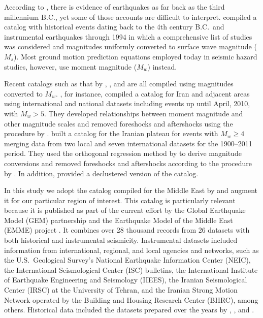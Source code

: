 According to \citet{Ambraseys_1982_Book}, there is evidence of earthquakes as far back as the third millennium B.C., yet some of those accounts are difficult to interpret. \citet{Mirzaei1997} compiled a catalog with historical events dating back to the 4th century B.C.~and instrumental earthquakes through 1994 in which a comprehensive list of studies was considered and magnitudes uniformly converted to surface wave magnitude ($M_s$). Most ground motion prediction equations employed today in seismic hazard studies, however, use moment magnitude ($M_w$) instead. 

Recent catalogs such as that by \citet{Karimiparidari2013}, \citet{Shahvar2013}, and \citet{Zare2014} are all compiled using magnitudes converted to $M_w$. \citet{Karimiparidari2013}, for instance, compiled a catalog for Iran and adjacent areas using international and national datasets including events up until April, 2010, with $M_w > 5$. They developed relationships between moment magnitude and other magnitude scales and removed foreshocks and aftershocks using the procedure by \citet{Gardner1974}. \citet{Shahvar2013} built a catalog for the Iranian plateau for events with $M_w \geq 4$ merging data from two local and seven international datasets for the 1900--2011 period. They used the orthogonal regression method by \citet{Castellaro2006} to derive magnitude conversions and removed foreshocks and aftershocks according to the procedure by \citet{Uhrhammer_1986_EN}. In addition, \citet{Shahvar2013} provided a declustered version of the catalog. 

In this study we adopt the catalog compiled for the Middle East by \citet{Zare2014} and augment it for our particular region of interest. This catalog is particularly relevant because it is published as part of the current effort by the Global Earthquake Model (GEM) partnership and the Earthquake Model of the Middle East (EMME) project . It combines over 28 thousand records from 26 datasets with both historical and instrumental seismicity. Instrumental datasets included information from international, regional, and local agencies and networks, such as the U.S.~Geological Survey's National Earthquake Information Center (NEIC), the International Seismological Center (ISC) bulletins, the International Institute of Earthquake Engineering and Seismology (IIEES), the Iranian Seismological Center (IRSC) at the University of Tehran, and the Iranian Strong Motion Network operated by the Building and Housing Research Center (BHRC), among others. Historical data included the datasets prepared over the years by \citet{Ambraseys_1982_Book}, \citet{Ambraseys_2005_Book}, and \citet{Ambraseys_2009_Book}.

